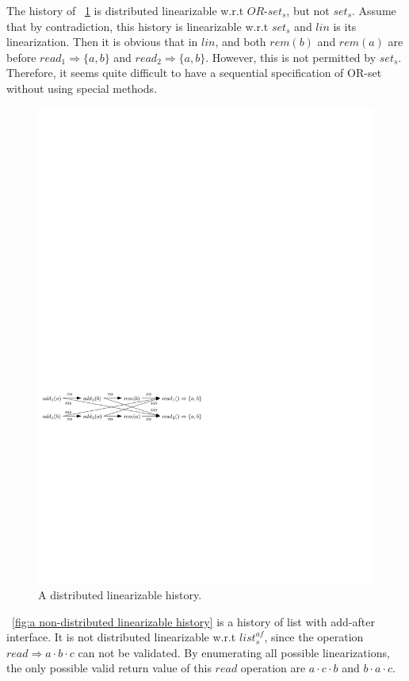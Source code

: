 The history of \figurename~\ref{fig:a distributed linearizable history} is distributed linearizable w.r.t $\mathit{OR}$-$\mathit{set}_s$, but not $\mathit{set}_s$. Assume that by contradiction, this history is linearizable w.r.t $\mathit{set}_s$ and $\mathit{lin}$ is its linearization. Then it is obvious that in $\mathit{lin}$, and both $\mathit{rem}(b)$ and $\mathit{rem}(a)$ are before $\mathit{read}_1 \Rightarrow \{ a,b \}$ and $\mathit{read}_2 \Rightarrow \{ a,b \}$. However, this is not permitted by $\mathit{set}_s$. Therefore, it seems quite difficult to have a sequential specification of OR-set without using special methods. 

\begin{figure}[t]
  \centering
  \includegraphics[width=0.7 \textwidth]{figures/PIC-His-Lin-ORSet.pdf}
  \caption{A distributed linearizable history.}
  \label{fig:a distributed linearizable history}
\end{figure} 

\figurename~\ref{fig:a non-distributed linearizable history} is a history of list with add-after interface. It is not distributed linearizable w.r.t $\mathit{list}_s^{\mathit{af}}$, since the operation $\mathit{read} \Rightarrow a \cdot b \cdot c$ can not be validated. By enumerating all possible linearizations, the only possible valid return value of this $\mathit{read}$ operation are $a \cdot c \cdot b$ and $b \cdot a \cdot c$. 

